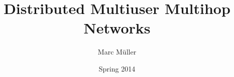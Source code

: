 \documentclass[a4paper,11pt]{book}
\begin{document}
\frontmatter
\title{Distributed Multiuser Multihop Networks}
\author{Marc Müller}
\date{Spring 2014}

\begin{titlepage}
  
\end{titlepage}


\tableofcontents
\listoffigures 
\listoftables
\listofalgorithms

\mainmatter
\renewcommand{\baselinestretch}{1}\normalsize %




\appendix
%

\cleardoublepage
{} 


\cleardoublepage

\end{document}
